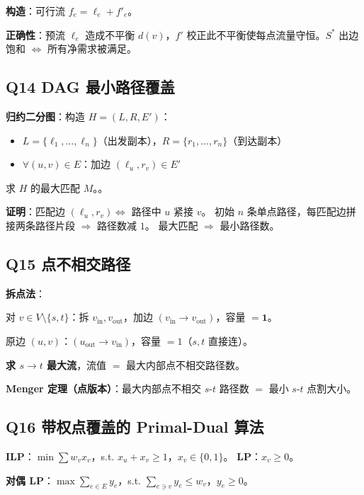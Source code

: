 \documentclass[11pt,a4paper]{ctexart}
\begin{document}
\textbf{构造}：可行流 $f_e = \ell_e + f'_e$。

\textbf{正确性}：预流 $\ell_e$ 造成不平衡 $d(v)$，$f'$ 校正此不平衡使每点流量守恒。$S^*$ 出边饱和 $\Leftrightarrow$ 所有净需求被满足。


\subsection*{Q14 \quad DAG 最小路径覆盖}

\textbf{归约二分图}：构造 $H=(L,R,E')$：
\begin{itemize}
\item $L=\{\ell_1,\dots,\ell_n\}$（出发副本），$R=\{r_1,\dots,r_n\}$（到达副本）
\item $\forall (u,v)\in E$：加边 $(\ell_u, r_v) \in E'$
\end{itemize}

求 $H$ 的最大匹配 $M$。。

\textbf{证明}：匹配边 $(\ell_u, r_v) \Leftrightarrow$ 路径中 $u$ 紧接 $v$。
初始 $n$ 条单点路径，每匹配边拼接两条路径片段 $\Rightarrow$ 路径数减 $1$。
最大匹配 $\Rightarrow$ 最小路径数。


\subsection*{Q15 \quad 点不相交路径}

\textbf{拆点法}：

对 $v \in V\setminus\{s,t\}$：拆 $v_{\text{in}},v_{\text{out}}$，加边 $(v_{\text{in}}\to v_{\text{out}})$，容量 $= \bm{1}$。

原边 $(u,v)$：$(u_{\text{out}}\to v_{\text{in}})$，容量 $=1$（$s,t$ 直接连）。

\textbf{求 $s\to t$ 最大流}，流值 $=$ 最大内部点不相交路径数。

\textbf{Menger 定理（点版本）}：最大内部点不相交 $s$-$t$ 路径数 $=$ 最小 $s$-$t$ 点割大小。


\subsection*{Q16 \quad 带权点覆盖的 Primal-Dual 算法}

\textbf{ILP}：$\min\sum w_v x_v$，s.t. $x_u+x_v\geq 1$，$x_v\in\{0,1\}$。
\textbf{LP}：$x_v \geq 0$。

\textbf{对偶 LP}：$\max\sum_{e\in E} y_e$，s.t. $\sum_{e\ni v} y_e \leq w_v$，$y_e \geq 0$。
\end{document}
